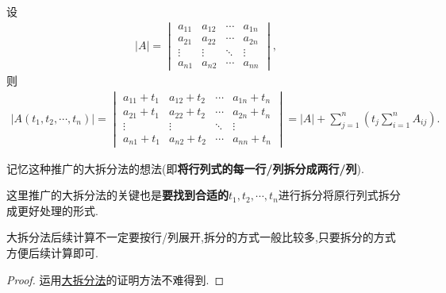\documentclass[../../main.tex]{subfiles}%
\begin{document}
\begin{corollary}\label{大拆分法的推广}
设
\begin{align*}
|A| = 
\begin{vmatrix}
a_{11} & a_{12} & \cdots & a_{1n} \\
a_{21} & a_{22} & \cdots & a_{2n} \\
\vdots & \vdots & \ddots & \vdots \\
a_{n1} & a_{n2} & \cdots & a_{nn}
\end{vmatrix},
\nonumber
\end{align*}
则
\begin{align*}
|A(t_1,t_2,\cdots,t_n)| = 
\begin{vmatrix}
a_{11}+t_1 & a_{12}+t_2 & \cdots & a_{1n}+t_n \\
a_{21}+t_1 & a_{22}+t_2 & \cdots & a_{2n}+t_n \\
\vdots & \vdots & \ddots & \vdots \\
a_{n1}+t_1 & a_{n2}+t_2 & \cdots & a_{nn}+t_n
\end{vmatrix}
= |A| + \sum_{j = 1}^{n} \left( t_j \sum_{i = 1}^{n} A_{ij} \right).
\nonumber
\end{align*}
\end{corollary}
\begin{note}
记忆这种推广的大拆分法的想法(即\textbf{将行列式的每一行/列拆分成两行/列}).

这里推广的大拆分法的关键也是\textbf{要找到合适的$t_1,t_2,\cdots,t_n$}进行拆分将原行列式拆分成更好处理的形式.
\end{note}
\begin{remark}
大拆分法后续计算不一定要按行/列展开,拆分的方式一般比较多,只要拆分的方式方便后续计算即可.
\end{remark}
\begin{proof}

运用\hyperlink{大拆分法}{大拆分法}的证明方法不难得到.

\end{proof}
\end{document}
